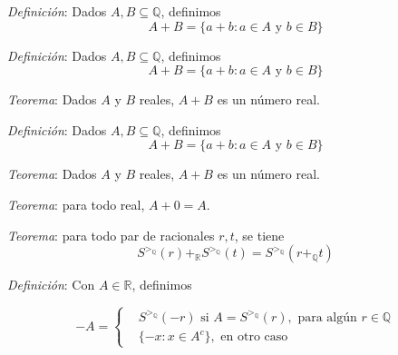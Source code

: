 \documentclass{beamer}
\begin{document}
  \begin{frame}

    \textit{Definición}: Dados $A, B \subseteq \mathbb{Q}$, definimos 
    \[A + B = \{a + b: a\in A \text{ y } b \in B\}\]

  \end{frame}

  \begin{frame}

    \textit{Definición}: Dados $A, B \subseteq \mathbb{Q}$, definimos 
    \[A + B = \{a + b: a\in A \text{ y } b \in B\}\]
    \newline\newline

    \textit{Teorema}: Dados $A$ y $B$ reales, $A + B$ es un número 
    real.

  \end{frame}

  \begin{frame}

    \textit{Definición}: Dados $A, B \subseteq \mathbb{Q}$, definimos 
    \[A + B = \{a + b: a\in A \text{ y } b \in B\}\]
    \newline\newline

    \textit{Teorema}: Dados $A$ y $B$ reales, $A + B$ es un número 
    real.
    \newline\newline

    \textit{Teorema}: para todo real, $A + 0 = A$.

  \end{frame}

  \begin{frame}
    \textit{Teorema}: para todo par de racionales $r, t$, se tiene
    \[S^{>_\mathbb{Q}}(r) +_\mathbb{R} S^{>_\mathbb{Q}}(t) = S^{>_\mathbb{Q}}(r +_\mathbb{Q} t)\]
  \end{frame}

  \begin{frame}

    \textit{Definición}: Con $A \in \mathbb{R}$, definimos

    \begin{equation*}
      -A = \left\{
      \begin{aligned}
        &S^{>_\mathbb{Q}}(-r) \text{ si }  A = S^{>_\mathbb{Q}}(r), \text{ para algún } r\in \mathbb{Q} \\
        &\{-x: x \in A^c\}, \text{ en otro caso}
      \end{aligned}
      \right.
    \end{equation*}

  \end{frame}
\end{document}
